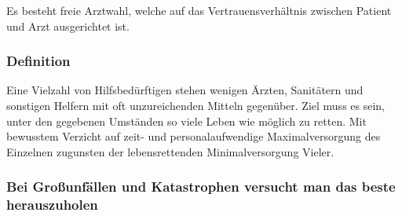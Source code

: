 
Es besteht freie Arztwahl, welche auf das Vertrauensverh\"altnis zwischen
Patient und Arzt ausgerichtet ist.

\subsubsection{Definition }


Eine Vielzahl von Hilfsbed\"urftigen stehen wenigen \"Arzten,
Sanit\"atern und sonstigen Helfern mit oft unzureichenden Mitteln
gegen\"uber. Ziel muss es sein, unter den gegebenen Umst\"anden so
viele Leben wie m\"oglich zu retten. Mit bewusstem Verzicht auf zeit-
und personalaufwendige Maximalversorgung des Einzelnen zugunsten der
lebensrettenden Minimalversorgung Vieler.

\subsubsection{Bei Gro{\ss}unf\"allen und Katastrophen versucht man das beste
herauszuholen}


